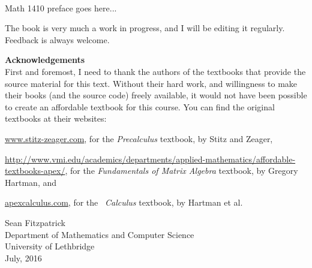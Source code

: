 \thispagestyle{empty}
\Huge
{}\\
\normalsize

Math 1410 preface goes here...

The book is very much a work in progress, and I will be editing it regularly. Feedback is always welcome. 

\newpage

\noindent\textbf{\large Acknowledgements}\\

First and foremost, I need to thank the authors of the textbooks that provide the source material for this text. Without their hard work, and willingness to make their books (and the source code) freely available, it would not have been possible to create an affordable textbook for this course. You can find the original textbooks at their websites:

\bigskip


\href{http://www.stitz-zeager.com}{www.stitz-zeager.com}, for the \textit{Precalculus} textbook, by Stitz and Zeager, 

\bigskip

\href{http://www.vmi.edu/academics/departments/applied-mathematics/affordable-textbooks-apex/}{http://www.vmi.edu/academics/departments/applied-mathematics/affordable-textbooks-apex/}, for the \textit{Fundamentals of Matrix Algebra} textbook, by Gregory Hartman, and

\bigskip

\href{http://www.apexcalculus.com}{apexcalculus.com}, for the \apex\ \textit{Calculus} textbook, by Hartman et al.



\vspace{1in}

\begin{raggedright}
Sean Fitzpatrick\\
Department of Mathematics and Computer Science\\
University of Lethbridge\\
July, 2016
\end{raggedright}




